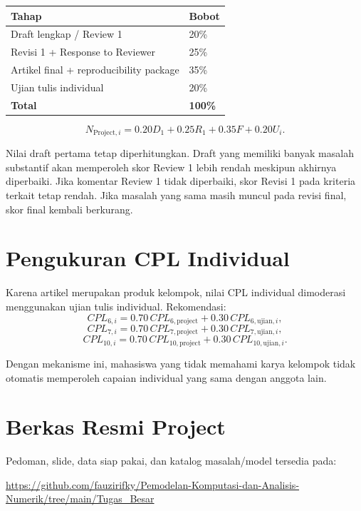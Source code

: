 \documentclass[11pt,a4paper]{article}
\begin{document}
\begin{tabularx}{\textwidth}{Y C{2cm}}
\toprule
\textbf{Tahap} & \textbf{Bobot} \\
\midrule
Draft lengkap / Review 1 & 20\% \\
Revisi 1 + Response to Reviewer & 25\% \\
Artikel final + reproducibility package & 35\% \\
Ujian tulis individual & 20\% \\
\midrule
\textbf{Total} & \textbf{100\%} \\
\bottomrule
\end{tabularx}

\[
N_{\mathrm{Project},i}
=0.20D_1+0.25R_1+0.35F+0.20U_i.
\]

Nilai draft pertama tetap diperhitungkan. Draft yang memiliki banyak masalah substantif akan memperoleh skor Review 1 lebih rendah meskipun akhirnya diperbaiki. Jika komentar Review 1 tidak diperbaiki, skor Revisi 1 pada kriteria terkait tetap rendah. Jika masalah yang sama masih muncul pada revisi final, skor final kembali berkurang.

\section{Pengukuran CPL Individual}

Karena artikel merupakan produk kelompok, nilai CPL individual dimoderasi menggunakan ujian tulis individual. Rekomendasi:
\[
CPL_{6,i}=0.70\,CPL_{6,\mathrm{project}}+0.30\,CPL_{6,\mathrm{ujian},i},
\]
\[
CPL_{7,i}=0.70\,CPL_{7,\mathrm{project}}+0.30\,CPL_{7,\mathrm{ujian},i},
\]
\[
CPL_{10,i}=0.70\,CPL_{10,\mathrm{project}}+0.30\,CPL_{10,\mathrm{ujian},i}.
\]

Dengan mekanisme ini, mahasiswa yang tidak memahami karya kelompok tidak otomatis memperoleh capaian individual yang sama dengan anggota lain.


\section{Berkas Resmi Project}

Pedoman, slide, data siap pakai, dan katalog masalah/model tersedia pada:
\begin{center}
\url{https://github.com/fauzirifky/Pemodelan-Komputasi-dan-Analisis-Numerik/tree/main/Tugas_Besar}
\end{center}
\end{document}
